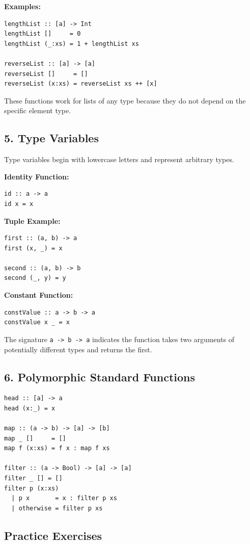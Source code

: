 \documentclass[12pt]{article}
\begin{document}
\textbf{Examples:}
\begin{verbatim}
lengthList :: [a] -> Int
lengthList []     = 0
lengthList (_:xs) = 1 + lengthList xs

reverseList :: [a] -> [a]
reverseList []     = []
reverseList (x:xs) = reverseList xs ++ [x]
\end{verbatim}

These functions work for lists of any type because they do not depend on the specific element type.

\subsection{5. Type Variables}

Type variables begin with lowercase letters and represent arbitrary types.

\textbf{Identity Function:}
\begin{verbatim}
id :: a -> a
id x = x
\end{verbatim}

\textbf{Tuple Example:}
\begin{verbatim}
first :: (a, b) -> a
first (x, _) = x

second :: (a, b) -> b
second (_, y) = y
\end{verbatim}

\textbf{Constant Function:}
\begin{verbatim}
constValue :: a -> b -> a
constValue x _ = x
\end{verbatim}

The signature \texttt{a -> b -> a} indicates the function takes two arguments of potentially different types and returns the first.

\subsection{6. Polymorphic Standard Functions}

\begin{verbatim}
head :: [a] -> a
head (x:_) = x

map :: (a -> b) -> [a] -> [b]
map _ []     = []
map f (x:xs) = f x : map f xs

filter :: (a -> Bool) -> [a] -> [a]
filter _ [] = []
filter p (x:xs)
  | p x       = x : filter p xs
  | otherwise = filter p xs
\end{verbatim}

\subsection{Practice Exercises}
\end{document}
